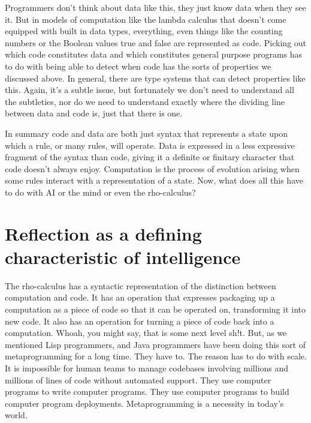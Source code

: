 \vspace{1\baselineskip}
Programmers don’t think about data like this, they just know data when they see it. But in models of computation like the lambda calculus that doesn’t come equipped with built in data types, everything, even things like the counting numbers or the Boolean values true and false are represented as code. Picking out which code constitutes data and which constitutes general purpose programs has to do with being able to detect when code has the sorts of properties we discussed above. In general, there are type systems that can detect properties like this. Again, it’s a subtle issue, but fortunately we don’t need to understand all the subtleties, nor do we need to understand exactly where the dividing line between data and code is, just that there is one. 

\vspace{1\baselineskip}
In summary code and data are both just syntax that represents a state upon which a rule, or many rules, will operate. Data is expressed in a less expressive fragment of the syntax than code, giving it a definite or finitary character that code doesn’t always enjoy. Computation is the process of evolution arising when some rules interact with a representation of a state. Now, what does all this have to do with AI or the mind or even the rho-calculus?

\vspace{1\baselineskip}
\section{Reflection as a defining characteristic of intelligence}

The rho-calculus has a syntactic representation of the distinction between computation and code. It has an operation that expresses packaging up a computation as a piece of code so that it can be operated on, transforming it into new code. It also has an operation for turning a piece of code back into a computation. Whoah, you might say, that is some next level sh!t. But, as we mentioned Lisp programmers, and Java programmers have been doing this sort of metaprogramming for a long time. They have to. The reason has to do with scale. It is impossible for human teams to manage codebases involving millions and millions of lines of code without automated support. They use computer programs to write computer programs. They use computer programs to build computer program deployments. Metaprogramming is a necessity in today’s world.


